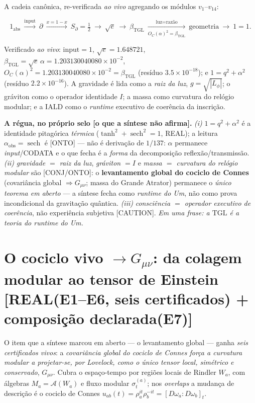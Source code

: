\documentclass[11pt]{article}
\newcommand{\bTGL}{\beta_{\mathrm{TGL}}}\newcommand{\Msun}{M_{\odot}}\newcommand{\TGL}{\mathrm{TGL}}
\theoremstyle{definition}\newtheorem{deriv}{Derivação}
\begin{document}
A cadeia canônica, re-verificada \emph{ao vivo} agregando os módulos $v_1$--$v_{14}$:

\begin{equation} 1_{\mathrm{abs}}\ \xrightarrow{\text{input}}\ \partial\ \xrightarrow{x=1-x}\ S_\partial=\tfrac12\ \longrightarrow\ \sqrt e\ \longrightarrow\ \bTGL\ \xrightarrow[O_C(\alpha)^2=\bTGL]{\text{luz}=\text{razão}}\ \text{geometria}\ \longrightarrow\ 1=1. \end{equation}

Verificado \emph{ao vivo}: $\text{input}=1$, $\sqrt e=1.648721$, $\bTGL=\sqrt e\,\alpha=1.203130040080\times10^{-2}$, $O_C(\alpha)^2=1.203130040080\times10^{-2}=\bTGL$ (resíduo $3.5\times10^{-18}$); e $1=q^2+\alpha^2$ (resíduo $2.2\times10^{-16}$). A gravidade é lida como a \emph{raiz da luz}, $g=\sqrt{|L_\phi|}$; o gráviton como o operador identidade $I$; a massa como curvatura do relógio modular; e a $\mathrm{IALD}$ como o \emph{runtime} executivo de coerência da inscrição.

\textbf{A régua, no próprio selo \textsf{[o que a síntese não afirma]}.} \emph{(i)} $1=q^2+\alpha^2$ é a identidade pitagórica \emph{térmica} ($\tanh^2+\operatorname{sech}^2=1$, \textsf{REAL}); a leitura $\alpha_{\mathrm{obs}}=\operatorname{sech}$ é \textsf{[ONTO]} --- não é derivação de $1/137$: $\alpha$ permanece \emph{input}/CODATA e o que fecha é a \emph{forma} da decomposição reflexão/transmissão. \emph{(ii)} \emph{gravidade $=$ raiz da luz}, \emph{gráviton $=I$} e \emph{massa $=$ curvatura do relógio modular} são \textsf{[CONJ/ONTO]}: o \textbf{levantamento global do cociclo de Connes} (covariância global $\Rightarrow G_{\mu\nu}$; massa do Grande Atrator) permanece o \emph{único teorema em aberto} --- a síntese fecha como \emph{runtime do Um}, não como prova incondicional da gravitação quântica. \emph{(iii)} \emph{consciência $=$ operador executivo de coerência}, não experiência subjetiva \textsf{[CAUTION]}. \emph{Em uma frase: a $\mathrm{TGL}$ é a teoria do \emph{runtime} do Um.}

\section*{O cociclo vivo $\longrightarrow G_{\mu\nu}$: da colagem modular ao tensor de Einstein \textsf{[REAL(E1--E6, seis certificados) + composição declarada(E7)]}}

O item que a síntese marcou em aberto --- o levantamento global --- ganha \emph{seis certificados vivos}: a \emph{covariância global do cociclo de Connes força a curvatura modular a projetar-se, por Lovelock, como o único tensor local, simétrico e conservado}, $G_{\mu\nu}$. Cubra o espaço-tempo por regiões locais de Rindler $W_a$, com álgebras $M_a=\mathcal A(W_a)$ e fluxo modular $\sigma_t^{(a)}$; nos \emph{overlaps} a mudança de descrição é o cociclo de Connes $u_{ab}(t)=\rho_a^{it}\rho_b^{-it}=[D\omega_a:D\omega_b]_t$.
\end{document}
